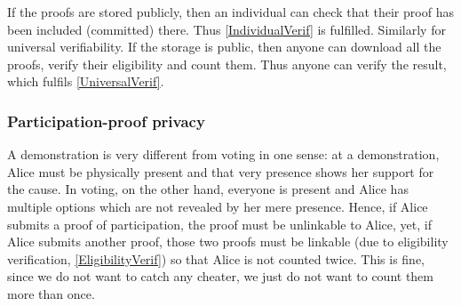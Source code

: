If the proofs are stored publicly, then an individual can check that their 
proof has been included (committed) there.
Thus \cref{IndividualVerif} is fulfilled.
Similarly for universal verifiability.
If the storage is public, then anyone can download all the proofs, verify their 
eligibility and count them.
Thus anyone can verify the result, which fulfils \cref{UniversalVerif}.


\subsubsection{Participation-proof privacy}

A demonstration is very different from voting in one sense: at a demonstration, 
Alice must be physically present and that very presence shows her support for 
the cause.
In voting, on the other hand, everyone is present and Alice has multiple 
options which are not revealed by her mere presence.
Hence, if Alice submits a proof of participation, the proof must be unlinkable 
to Alice, yet, if Alice submits another proof, those two proofs must be 
linkable (due to eligibility verification, \cref{EligibilityVerif}) so that 
Alice is not counted twice.
This is fine, since we do not want to catch any cheater, we just do not want to
count them more than once.

